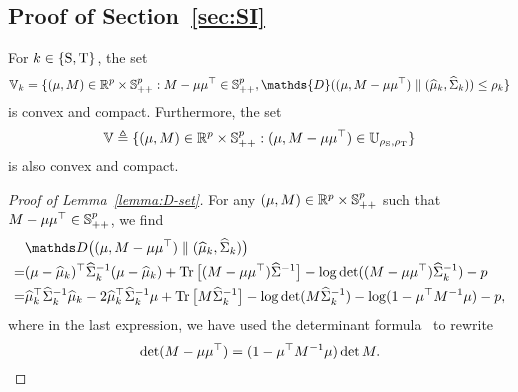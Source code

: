 \documentclass{article}
\begin{document}
\subsection{Proof of Section~\ref{sec:SI}}

\begin{lemma}[Compactness] \label{lemma:D-set}
For $k\in \{\rm S, \rm T\}$, the set
\[\mbb V_k = \{(\mu, M) \in \R^p\times \mbb S^p_{++} : M- \mu \mu^\top \in \mbb S_{++}^p, \mathds{D}((\mu, M-\mu\mu^\top) \parallel (\msa_k, \covsa_k)) \leq \rho_{k} \} \] 
is convex and compact. Furthermore, the set
\[\mathbb V \triangleq \{(\mu, M) \in \mathbb{R}^p\times \mathbb S^p_{++} :(\mu, M- \mu\mu^\top) \in \mathbb U_{\rho_{\rm S}, \rho_{\rm T}}\} \]
is also convex and compact.
\end{lemma}

\begin{proof}[Proof of Lemma~\ref{lemma:D-set}]
	For any $(\mu, M) \in \mathbb{R}^p\times \mathbb S^p_{++} $ such that $M - \mu\mu^\top \in \mathbb{S}_{++}^p$, we find
	\begin{align}
		&\mathds D\big((\m, M-\m\m^\top) \parallel (\msa_k, \covsa_k)\big) \notag\\
		=& (\m - \msa_k)^\top\covsa^{-1}_k (\m - \msa_k) +\Tr{(M - \m\m^\top) \covsa^{-1}} - \log\det ((M - \m\m^\top) \covsa_k^{-1}) - p \notag\\
		=& \msa_k^\top \covsa_k^{-1} \msa_k - 2 \msa_k^\top \covsa_k^{-1} \m+\Tr{M\covsa_k^{-1}} - \log\det (M\covsa_k^{-1}) - \log(1- \m^\top M^{-1} \m) - p \label{eq:divergence_mu_M},
	\end{align}
	where in the last expression, we have used the determinant formula~\citep[Fact~2.16.3]{ref:bernstein2009matrix} to rewrite
	\[
	    \det(M - \mu\mu^\top) = (1 - \mu^\top M^{-1} \mu) \det M.
	\]
	
	
	

\end{proof}
\end{document}
